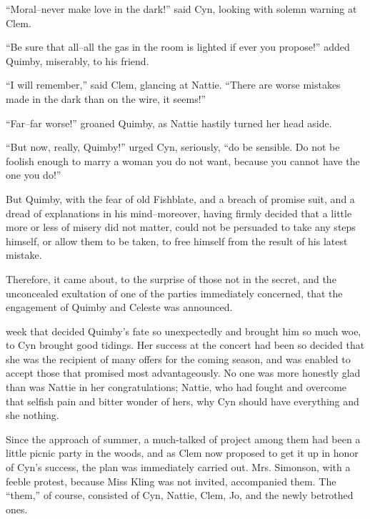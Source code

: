 ``Moral--never make love in the dark!'' said Cyn, looking with solemn
warning at Clem.

``Be sure that all--all the gas in the room is lighted if ever you
propose!'' added Quimby, miserably, to his friend.

``I will remember,'' said Clem, glancing at Nattie. ``There are worse
mistakes made in the dark than on the wire, it seems!''

``Far--far worse!'' groaned Quimby, as Nattie hastily turned her head
aside.

``But now, really, Quimby!'' urged Cyn, seriously, ``do be sensible. Do not
be foolish enough to marry a woman you do not want, because you cannot
have the one you do!''

But Quimby, with the fear of old Fishblate, and a breach of promise
suit, and a dread of explanations in his mind--moreover, having firmly
decided that a little more or less of misery did not matter, could not
be persuaded to take any steps himself, or allow them to be taken, to
free himself from the result of his latest mistake.

Therefore, it came about, to the surprise of those not in the secret,
and the unconcealed exultation of one of the parties immediately
concerned, that the engagement of Quimby and Celeste was announced.

\ifChapterNoPageBreak
\clearpage%
\fi






 week that decided Quimby's fate so unexpectedly and brought him so
much woe, to Cyn brought good tidings. Her success at the concert had
been so decided that she was the recipient of many offers for the coming
season, and was enabled to accept those that promised most
advantageously. No one was more honestly glad than was Nattie in her
congratulations; Nattie, who had fought and overcome that selfish pain
and bitter wonder of hers, why Cyn should have everything and she
nothing.

Since the approach of summer, a much-talked of project among them had
been a little picnic party in the woods, and as Clem now proposed to get
it up in honor of Cyn's success, the plan was immediately carried out.
Mrs. Simonson, with a feeble protest, because Miss Kling was not
invited, accompanied them. The ``them,'' of course, consisted of Cyn,
Nattie, Clem, Jo, and the newly betrothed ones.


